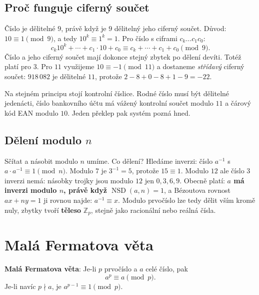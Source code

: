 \subsection{Proč funguje ciferný součet}

\begin{example}
  Číslo je dělitelné $9$, právě když je $9$ dělitelný jeho ciferný součet. Důvod: $10\equiv 1\pmod 9$, a tedy $10^k\equiv 1^k = 1$. Pro číslo s ciframi $c_k\ldots c_1c_0$:
  \begin{equation*}
    c_k10^k + \cdots + c_1\cdot 10 + c_0\equiv c_k + \cdots + c_1 + c_0\pmod 9.
  \end{equation*}
  Číslo a jeho ciferný součet mají dokonce stejný zbytek po dělení devíti. Totéž platí pro $3$. Pro $11$ využijeme $10\equiv -1\pmod{11}$ a dostaneme \textit{střídavý} ciferný součet: $918\,082$ je dělitelné $11$, protože $2 - 8 + 0 - 8 + 1 - 9 = -22$.
\end{example}

Na stejném principu stojí kontrolní číslice. Rodné číslo musí být dělitelné jedenácti, číslo bankovního účtu má vážený kontrolní součet modulo $11$ a čárový kód EAN modulo $10$. Jeden překlep pak systém pozná hned.

\subsection{Dělení modulo $n$}

Sčítat a násobit modulo $n$ umíme. Co dělení? Hledáme inverzi: číslo $a^{-1}$ s $a\cdot a^{-1}\equiv 1\pmod{n}$. Modulo $7$ je $3^{-1} = 5$, protože $15\equiv 1$. Modulo $12$ ale číslo $3$ inverzi nemá: násobky trojky jsou modulo $12$ jen $0, 3, 6, 9$. Obecně platí: \textbf{$a$ má inverzi modulo $n$, právě když $\operatorname{NSD}(a, n) = 1$}, a Bézoutova rovnost $ax + ny = 1$ ji rovnou najde: $a^{-1}\equiv x$. Modulo prvočíslo lze tedy dělit vším kromě nuly, zbytky tvoří \textbf{těleso} $\mathbb{Z}_p$, stejně jako racionální nebo reálná čísla.

\section{Malá Fermatova věta}

\begin{definitionbox}
  \textbf{Malá Fermatova věta}: Je-li $p$ prvočíslo a $a$ celé číslo, pak
  \begin{equation*}
    a^p\equiv a\pmod{p}.
  \end{equation*}
  Je-li navíc $p\nmid a$, je $a^{p-1}\equiv 1\pmod{p}$.
\end{definitionbox}

